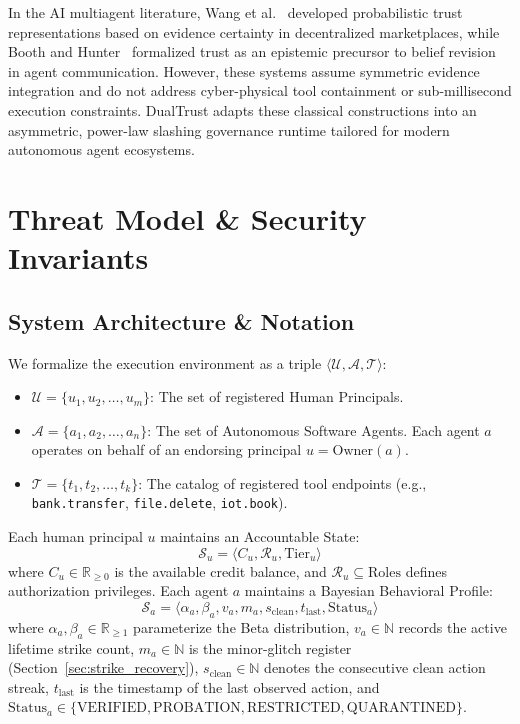 \documentclass[manuscript, screen, review]{jair}
\begin{document}
In the AI multiagent literature, Wang et al.~\cite{wang2011probabilistic} developed probabilistic trust representations based on evidence certainty in decentralized marketplaces, while Booth and Hunter~\cite{booth2018trust} formalized trust as an epistemic precursor to belief revision in agent communication. However, these systems assume symmetric evidence integration and do not address cyber-physical tool containment or sub-millisecond execution constraints. DualTrust adapts these classical constructions into an asymmetric, power-law slashing governance runtime tailored for modern autonomous agent ecosystems.

\section{Threat Model \& Security Invariants}
\label{sec:threat_model}

\subsection{System Architecture \& Notation}
We formalize the execution environment as a triple $\langle \mathcal{U}, \mathcal{A}, \mathcal{T} \rangle$:
\begin{itemize}[leftmargin=12pt, topsep=2pt, itemsep=1pt]
\item $\mathcal{U} = \{u_1, u_2, \dots, u_m\}$: The set of registered Human Principals.
\item $\mathcal{A} = \{a_1, a_2, \dots, a_n\}$: The set of Autonomous Software Agents. Each agent $a$ operates on behalf of an endorsing principal $u = \text{Owner}(a)$.
\item $\mathcal{T} = \{t_1, t_2, \dots, t_k\}$: The catalog of registered tool endpoints (e.g., \texttt{bank.transfer}, \texttt{file.delete}, \texttt{iot.book}).
\end{itemize}

Each human principal $u$ maintains an Accountable State:
\begin{equation}
\mathcal{S}_u = \langle C_u, \mathcal{R}_u, \text{Tier}_u \rangle
\end{equation}
where $C_u \in \mathbb{R}_{\ge 0}$ is the available credit balance, and $\mathcal{R}_u \subseteq \text{Roles}$ defines authorization privileges. Each agent $a$ maintains a Bayesian Behavioral Profile:
\begin{equation}
\mathcal{S}_a = \langle \alpha_a, \beta_a, v_a, m_a, s_{\text{clean}}, t_{\text{last}}, \text{Status}_a \rangle
\end{equation}
where $\alpha_a, \beta_a \in \mathbb{R}_{\ge 1}$ parameterize the Beta distribution, $v_a \in \mathbb{N}$ records the active lifetime strike count, $m_a \in \mathbb{N}$ is the minor-glitch register (Section~\ref{sec:strike_recovery}), $s_{\text{clean}} \in \mathbb{N}$ denotes the consecutive clean action streak, $t_{\text{last}}$ is the timestamp of the last observed action, and $\text{Status}_a \in \{\text{VERIFIED}, \text{PROBATION}, \text{RESTRICTED}, \text{QUARANTINED}\}$.
\end{document}
